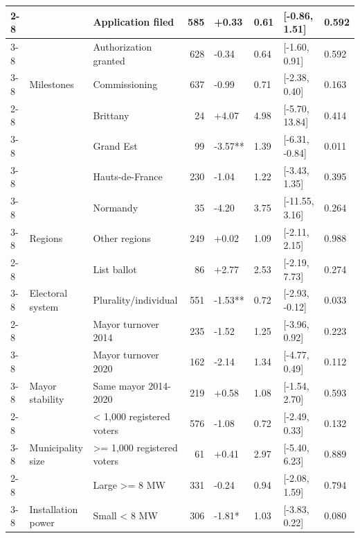 \begin{ThreePartTable}
\begin{longtable}[t]{lllrllll}
\cmidrule{2-8}\nopagebreak
 &  & Application filed & 585 & +0.33 & 0.61 & {}[-0.86, 1.51] & 0.592\\
\cmidrule{3-8}\nopagebreak
 &  & Authorization granted & 628 & -0.34 & 0.64 & {}[-1.60, 0.91] & 0.592\\
\cmidrule{3-8}\nopagebreak
 & \multirow[t]{-3}{*}{\raggedright\arraybackslash Milestones} & Commissioning & 637 & -0.99 & 0.71 & {}[-2.38, 0.40] & 0.163\\
\cmidrule{2-8}\nopagebreak
 &  & Brittany & 24 & +4.07 & 4.98 & {}[-5.70, 13.84] & 0.414\\
\cmidrule{3-8}\nopagebreak
 &  & Grand Est & 99 & -3.57** & 1.39 & {}[-6.31, -0.84] & 0.011\\
\cmidrule{3-8}\nopagebreak
 &  & Hauts-de-France & 230 & -1.04 & 1.22 & {}[-3.43, 1.35] & 0.395\\
\cmidrule{3-8}\nopagebreak
 &  & Normandy & 35 & -4.20 & 3.75 & {}[-11.55, 3.16] & 0.264\\
\cmidrule{3-8}\nopagebreak
 & \multirow[t]{-5}{*}{\raggedright\arraybackslash Regions} & Other regions & 249 & +0.02 & 1.09 & {}[-2.11, 2.15] & 0.988\\
\cmidrule{2-8}\nopagebreak
 &  & List ballot & 86 & +2.77 & 2.53 & {}[-2.19, 7.73] & 0.274\\
\cmidrule{3-8}\nopagebreak
 & \multirow[t]{-2}{*}{\raggedright\arraybackslash Electoral system} & Plurality/individual & 551 & -1.53** & 0.72 & {}[-2.93, -0.12] & 0.033\\
\cmidrule{2-8}\nopagebreak
 &  & Mayor turnover 2014 & 235 & -1.52 & 1.25 & {}[-3.96, 0.92] & 0.223\\
\cmidrule{3-8}\nopagebreak
 &  & Mayor turnover 2020 & 162 & -2.14 & 1.34 & {}[-4.77, 0.49] & 0.112\\
\cmidrule{3-8}\nopagebreak
 & \multirow[t]{-3}{*}{\raggedright\arraybackslash Mayor stability} & Same mayor 2014-2020 & 219 & +0.58 & 1.08 & {}[-1.54, 2.70] & 0.593\\
\cmidrule{2-8}\nopagebreak
 &  & < 1,000 registered voters & 576 & -1.08 & 0.72 & {}[-2.49, 0.33] & 0.132\\
\cmidrule{3-8}\nopagebreak
 & \multirow[t]{-2}{*}{\raggedright\arraybackslash Municipality size} & >= 1,000 registered voters & 61 & +0.41 & 2.97 & {}[-5.40, 6.23] & 0.889\\
\cmidrule{2-8}\nopagebreak
 &  & Large >= 8 MW & 331 & -0.24 & 0.94 & {}[-2.08, 1.59] & 0.794\\
\cmidrule{3-8}\nopagebreak
 & \multirow[t]{-2}{*}{\raggedright\arraybackslash Installation power} & Small < 8 MW & 306 & -1.81* & 1.03 & {}[-3.83, 0.22] & 0.080\\

\end{longtable}
\end{ThreePartTable}
